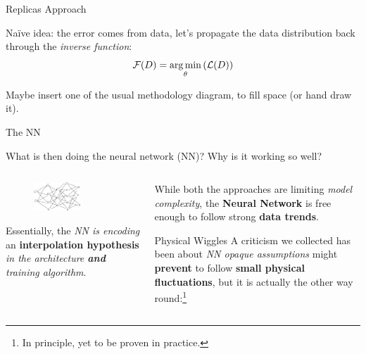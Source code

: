 \documentclass[9pt]{beamer}
\begin{document}
\begin{frame}{Replicas}
    \nnpdf{} Approach

    Na\"ive idea: the error comes from data, let's propagate the data
    distribution back through the \textit{inverse function}:
    \begin{equation*}
        \mathcal{F}(D) = \operatorname*{arg\,min}_\theta\left(\mathcal{L}(D)\right)
    \end{equation*}

    Maybe insert one of the usual methodology diagram, to fill space (or hand
    draw it).
\end{frame}

\begin{frame}{The NN}
    \begin{center}
        What is then doing the neural network (NN)? Why is it working so well?
    \end{center}
    \vspace*{10pt}

    \begin{columns}
        \begin{column}{0.5\textwidth}
            \begin{figure}
                \centering
                \includegraphics[width=0.6\textwidth]{nn}
            \end{figure}

            \vspace*{10pt}
                Essentially, the \textit{NN is encoding} an
                \alert{\textbf{interpolation hypothesis}} \textit{in the
                architecture \textbf{and} training algorithm}.
        \end{column}
        \begin{column}{0.5\textwidth}
            While both the approaches are limiting \textit{model complexity},
            the \textbf{Neural Network} is free enough to follow strong
            \textbf{data trends}.

            \vspace*{10pt}
            \begin{exampleblock}{Physical Wiggles}
                A criticism we collected has been about \textit{NN opaque
                assumptions} might \textbf{prevent} to follow \textbf{small
                physical fluctuations}, but it is actually the other way
                round:\footnote{In principle, yet to be proven in practice.}


\end{exampleblock}
\end{column}
\end{columns}
\end{frame}
\end{document}
